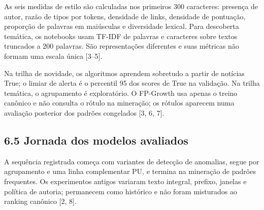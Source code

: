 \documentclass[
  brazilian,
  11pt,
]{article}
\begin{document}
As seis medidas de estilo são calculadas nos primeiros 300 caracteres: presença de autor, razão de tipos por tokens, densidade de links, densidade de pontuação, proporção de palavras em maiúsculas e diversidade lexical. Para descoberta temática, os notebooks usam TF-IDF de palavras e caracteres sobre textos truncados a 200 palavras. São representações diferentes e suas métricas não formam uma escala única {[}3--5{]}.

Na trilha de novidade, os algoritmos aprendem sobretudo a partir de notícias True; o limiar de alerta é o percentil 95 dos scores de True na validação. Na trilha temática, o agrupamento é exploratório. O FP-Growth usa apenas o treino canônico e não consulta o rótulo na mineração; os rótulos aparecem numa avaliação posterior dos padrões congelados {[}3, 6, 7{]}.

\subsection{6.5 Jornada dos modelos avaliados}\label{jornada-dos-modelos-avaliados}

A sequência registrada começa com variantes de detecção de anomalias, segue por agrupamento e uma linha complementar PU, e termina na mineração de padrões frequentes. Os experimentos antigos variaram texto integral, prefixo, janelas e política de autoria; permanecem como histórico e não foram misturados ao ranking canônico {[}2, 8{]}.
\end{document}
